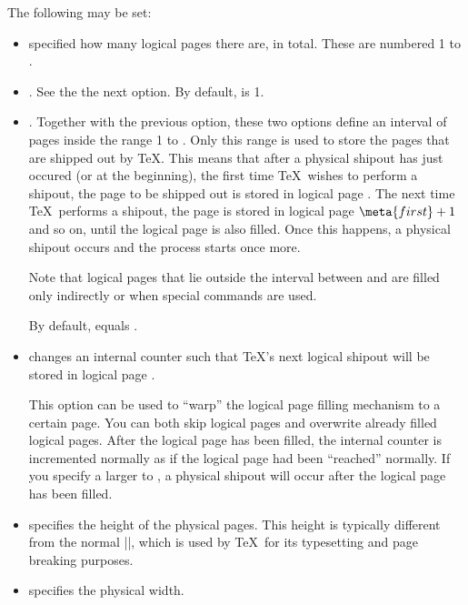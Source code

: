 \begin{command}{\pgfpagesphysicalpageoptions{}}
  The following  may be set:
  \begin{itemize}
    \item {} specified how many
    logical pages there are, in total. These are numbered 1 to
    .
    \item {}. See the the
      next option. By default,  is 1.
    \item {}. Together
    with the previous option, these two options define an interval of
    pages inside the range 1 to . Only this range
    is used to store the pages that are shipped out by \TeX. This
    means that after a physical shipout has just occured (or at the
    beginning), the first time \TeX\ wishes to perform a shipout, the
    page to be shipped out is stored in logical page . The
    next time \TeX\ performs a shipout, the page is stored in logical
    page $\meta{first} +1$ and so on, until the logical page
     is also filled. Once this happens, a physical shipout
    occurs and the process starts once more.

    Note that logical pages that lie outside the interval between
     and  are filled only indirectly or when
    special commands are used.

    By default,  equals .
  \item {} changes
    an internal counter such that \TeX's next logical shipout will be
    stored in logical page .

    This option can be used to ``warp'' the logical page filling
    mechanism to a certain page. You can both skip logical pages and
    overwrite already filled logical pages. After the logical page
     has been filled, the internal counter is
    incremented normally as if the logical page  had
    been ``reached'' normally. If you specify a  larger
    to , a physical shipout will occur after the logical
    page  has been filled.
  \item
    specifies the height of the physical pages. This height is
    typically different from the normal  |\paperheight|, which is used
    by \TeX\ for its typesetting and page breaking purposes.
  \item
    specifies the physical width.
  \end{itemize}
\end{command}


